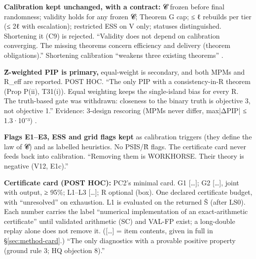 \par\smallskip\noindent{}
{\textbf{Calibration kept unchanged, with a contract:} 𝓒 frozen before final randomness; validity holds for any frozen 𝓒; Theorem G
cap; ≤ ℓ rebuilds per tier (≤ 2ℓ with escalation); restricted ESS on V only; statuses distinguished. Shortening it (C9) is
rejected. }
{``Validity does not depend on calibration converging. The missing theorems concern efficiency and delivery (theorem
obligations).'' Shortening calibration ``weakens three existing theorems'' .}

\par\smallskip\noindent{}
{\textbf{Ẑ-weighted PIP is primary,} equal-weight is secondary, and both MPMs and R\_eff are reported. POST HOC.
}
{``The only PIP with a consistency-in-R theorem (Prop P(ii), T31(i)). Equal weighting keeps the single-island bias for every R. The
truth-based gate was withdrawn: closeness to the binary truth is objective 3, not objective 1.'' Evidence: 3-design rescoring
(MPMs never differ, max|ΔPIP| ≤ 1.3·10⁻³) .}

\par\smallskip\noindent{}
{\textbf{Flags E1–E3, ESS and grid flags kept} as calibration triggers (they define the law of 𝓒) and as labelled heuristics. No
PSIS/R̂ flags. The certificate card never feeds back into calibration. }
{``Removing them is WORKHORSE. Their theory is negative (V12, E1c).''}

\par\smallskip\noindent{}
{\textbf{Certificate card (POST HOC):} PC2's minimal card. G1 [\dots]; G2 [\dots], joint with output, ≥ 95\%; L1–L3 [\dots]; R optional
(box). One declared certificate budget, with ``unresolved'' on exhaustion. L1 is evaluated on the returned Ŝ (after LS0). Each
number carries the label ``numerical implementation of an exact-arithmetic certificate'' until validated arithmetic (SC) and VAL-FP
exist; a long-double replay alone does not remove it.  ([\dots] = item contents, given
in full in \S\ref{sec:method-card}.)}
{``The only diagnostics with a provable positive property (ground rule 3; HQ objection 8).''}

